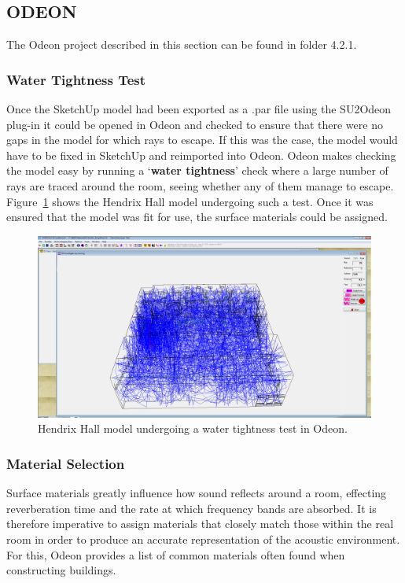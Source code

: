 \documentclass[../../main.tex]{subfiles}
\begin{document}
\subsection{ODEON}

	The Odeon project described in this section can be found in folder 4.2.1.

	\label{odeon}
	\subsubsection{Water Tightness Test}
		Once the SketchUp model had been exported as a .par file using the SU2Odeon plug-in \cite{SU2Odeon} it could be opened in Odeon and checked to ensure that there were no gaps in the model for which rays to escape. If this was the case, the model would have to be fixed in SketchUp and reimported into Odeon. Odeon makes checking the model easy by running a `\textbf{water tightness}' check where a large number of rays are traced around the room, seeing whether any of them manage to escape. Figure~\ref{watertight} shows the Hendrix Hall model undergoing such a test. Once it was ensured that the model was fit for use, the surface materials could be assigned.

		\begin{figure}[H]
			\centerline{\includegraphics[scale = 0.3]{Sections/Implementation/Odeon/images/OdeonRays/waterTight2.PNG}}
			\caption{Hendrix Hall model undergoing a water tightness test in Odeon.}
			\label{watertight}
		\end{figure}

	\subsubsection{Material Selection}
	\label{odeon:materials}
		Surface materials greatly influence how sound reflects around a room, effecting reverberation time and the rate at which frequency bands are absorbed. It is therefore imperative to assign materials that closely match those within the real room in order to produce an accurate representation of the acoustic environment. For this, Odeon provides a list of common materials often found when constructing buildings.
\end{document}
